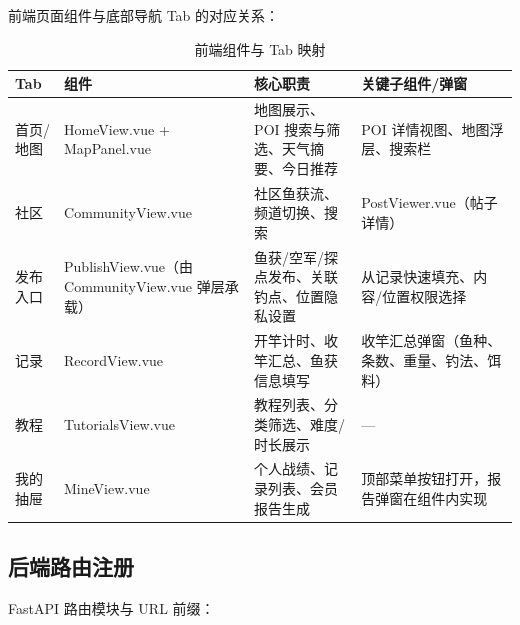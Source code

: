 前端页面组件与底部导航 Tab 的对应关系：

\begin{table}[H]
  \centering
  \caption{前端组件与 Tab 映射}
  \label{tab:components}
  \begin{tabularx}{\textwidth}{p{1.5cm}|p{3cm}|p{5cm}|p{5cm}}
    \toprule
    \textbf{Tab} & \textbf{组件} & \textbf{核心职责} & \textbf{关键子组件/弹窗} \\
    \midrule
    首页/地图 & HomeView.vue + MapPanel.vue & 地图展示、POI 搜索与筛选、天气摘要、今日推荐 & POI 详情视图、地图浮层、搜索栏 \\
    \hline
    社区 & CommunityView.vue & 社区鱼获流、频道切换、搜索 & PostViewer.vue（帖子详情） \\
    \hline
    发布入口 & PublishView.vue（由 CommunityView.vue 弹层承载） & 鱼获/空军/探点发布、关联钓点、位置隐私设置 & 从记录快速填充、内容/位置权限选择 \\
    \hline
    记录 & RecordView.vue & 开竿计时、收竿汇总、鱼获信息填写 & 收竿汇总弹窗（鱼种、条数、重量、钓法、饵料） \\
    \hline
    教程 & TutorialsView.vue & 教程列表、分类筛选、难度/时长展示 & — \\
    \hline
    我的抽屉 & MineView.vue & 个人战绩、记录列表、会员报告生成 & 顶部菜单按钮打开，报告弹窗在组件内实现 \\
    \bottomrule
  \end{tabularx}
\end{table}

\subsection{后端路由注册}

FastAPI 路由模块与 URL 前缀：

